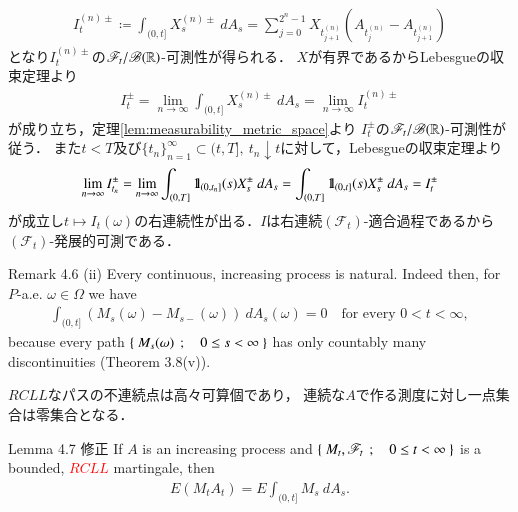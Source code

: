 \begin{prf}
\begin{align}
			I^{(n)\pm}_t \coloneqq \int_{(0,t]} X^{(n)\pm}_s\ dA_s
			= \sum_{j=0}^{2^n-1} X_{t^{(n)}_{j+1}} \left(A_{t^{(n)}_j} - A_{t^{(n)}_{j+1}}\right)
		\end{align}
		となり$I^{(n)\pm}_t$の$\mathscr{F}_t/\mathscr{B}(\mathbb{R})$-可測性が得られる．
		$X$が有界であるからLebesgueの収束定理より
		\begin{align}
			I^{\pm}_t = \lim_{n \to \infty} \int_{(0,t]} X^{(n)\pm}_s\ dA_s
			= \lim_{n \to \infty} I^{(n)\pm}_t
		\end{align}
		が成り立ち，定理\ref{lem:measurability_metric_space}より
		$I^{\pm}_t$の$\mathscr{F}_t/\mathscr{B}(\mathbb{R})$-可測性が従う．
		また$t<T$及び$\{t_n\}_{n=1}^\infty \subset (t,T],\ t_n \downarrow t$に対して，Lebesgueの収束定理より
		\begin{align}
			\lim_{n \to \infty} I^\pm_{t_n}
			= \lim_{n \to \infty} \int_{(0,T]} \mbox{1}\hspace{-0.25em}\mbox{l}_{(0,t_n]}(s)X^\pm_s\ dA_s
			= \int_{(0,T]} \mbox{1}\hspace{-0.25em}\mbox{l}_{(0,t]}(s)X^\pm_s\ dA_s
			= I^\pm_t
		\end{align}
		が成立し$t \longmapsto I_t(\omega)$の右連続性が出る．$I$は右連続$(\mathscr{F}_t)$-適合過程であるから
		$(\mathscr{F}_t)$-発展的可測である．
		\QED
	\end{prf}
	
	\begin{itembox}[l]{Remark 4.6 (ii)}
		Every continuous, increasing process is natural. Indeed then, for $P$-a.e. $\omega \in \Omega$
		we have
		\begin{align}
			\int_{(0,t]} (M_s(\omega)-M_{s-}(\omega))\ dA_s(\omega) = 0
			\quad \mbox{for every $0 < t < \infty$},
		\end{align}
		because every path $\left\{\ M_s(\omega)\ \, ; \quad 0 \leq s < \infty\ \right\}$ has only countably many discontinuities
		(Theorem 3.8(v)).
	\end{itembox}
	
	\begin{prf}
		$RCLL$なパスの不連続点は高々可算個であり，
		連続な$A$で作る測度に対し一点集合は零集合となる．
		\QED
	\end{prf}
	
	\begin{itembox}[l]{Lemma 4.7 修正}
		If $A$ is an increasing process and $\left\{\ M_t,\mathscr{F}_t\ \, ; \quad 0 \leq t < \infty\ \right\}$ is a bounded,
		\textcolor{red}{$RCLL$} martingale, then
		\begin{align}
			E(M_t A_t) = E \int_{(0,t]} M_s\ dA_s.
		\end{align}
	\end{itembox}
	
